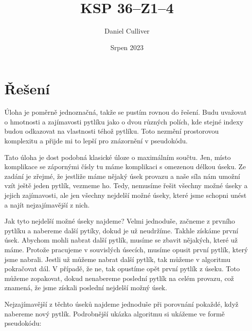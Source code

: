 \documentclass{../../../ksp-smallText}
\title{KSP 36--Z1--4}
\author{Daniel Culliver}
\date{Srpen 2023}
\begin{document}
\maketitle

\section*{Řešení}

Úloha je poměrně jednoznačná, takže se pustím rovnou do řešení. Budu uvažovat o hmotnosti a zajímavosti pytlíku
jako o dvou různých polích, kde stejné indexy budou odkazovat na vlastnosti téhož pytlíku. Toto nezmění prostorovou komplexitu
a přijde mi to lepší pro znázornění v pseudokódu.

Tato úloha je dost podobná klasické úloze o maximálním součtu. Jen, místo komplikace se zápornými čísly tu máme komplikaci s
omezenou délkou úseku. Ze zadání je zřejmé, že jestliže máme nějaký úsek provazu a naše síla nám umožní vzít ještě jeden pytlík,
vezmeme ho. Tedy, nemusíme řešit všechny možné úseky a jejich zajímavosti, ale jen všechny nejdelší možné úseky, 
které jsme schopni unést a najít nejzajímavější z nich.
 
Jak tyto nejdelší možné úseky najdeme? Velmi jednoduše, začneme z prvního pytlíku a nabereme další pytíky, dokud je už neudržíme.
Takhle získáme první úsek. Abychom mohli nabrat další pytlík, musíme se zbavit nějakých, které už máme. Protože pracujeme
v souvislých úsecích, musíme opusit první pytlík, který jsme nabrali. Jestli už můžeme nabrat další pytlík, tak můžeme v algoritmu pokračovat dál.
V případě, že ne, tak opustíme opět první pytlík z úseku. Toto můžeme zopakovat, dokud nenabereme poslední pytlík na celém provazu,
což znamená, že jsme získali poslední nejdelší možný úsek.

Nejzajímavější z těchto úseků najdeme jednoduše při porovnání pokaždé, když nabereme nový pytlík. Podrobnější ukázka algoritmu
si ukážeme ve formě pseudokódu:
\end{document}
